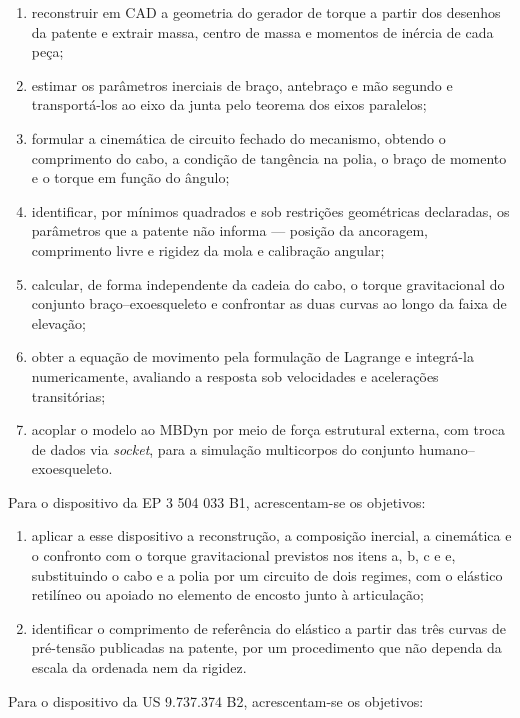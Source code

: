 \begin{enumerate}[label=\alph*)]
  \item reconstruir em CAD a geometria do gerador de torque a partir dos desenhos da patente e extrair massa, centro de massa e momentos de inércia de cada peça;
  \item estimar os parâmetros inerciais de braço, antebraço e mão segundo \textcite{deleva1996} e transportá-los ao eixo da junta pelo teorema dos eixos paralelos;
  \item formular a cinemática de circuito fechado do mecanismo, obtendo o comprimento do cabo, a condição de tangência na polia, o braço de momento e o torque em função do ângulo;
  \item identificar, por mínimos quadrados e sob restrições geométricas declaradas, os parâmetros que a patente não informa — posição da ancoragem, comprimento livre e rigidez da mola e calibração angular;
  \item calcular, de forma independente da cadeia do cabo, o torque gravitacional do conjunto braço–exoesqueleto e confrontar as duas curvas ao longo da faixa de elevação;
  \item obter a equação de movimento pela formulação de Lagrange e integrá-la numericamente, avaliando a resposta sob velocidades e acelerações transitórias;
  \item acoplar o modelo ao MBDyn por meio de força estrutural externa, com troca de dados via \textit{socket}, para a simulação multicorpos do conjunto humano–exoesqueleto.
\end{enumerate}

Para o dispositivo da EP 3 504 033 B1, acrescentam-se os objetivos:

\begin{enumerate}[label=\alph*), start=8]
  \item aplicar a esse dispositivo a reconstrução, a composição inercial, a cinemática e o confronto com o torque gravitacional previstos nos itens a, b, c e e, substituindo o cabo e a polia por um circuito de dois regimes, com o elástico retilíneo ou apoiado no elemento de encosto junto à articulação;
  \item identificar o comprimento de referência do elástico a partir das três curvas de pré-tensão publicadas na patente, por um procedimento que não dependa da escala da ordenada nem da rigidez.
\end{enumerate}

Para o dispositivo da US 9.737.374 B2, acrescentam-se os objetivos:

